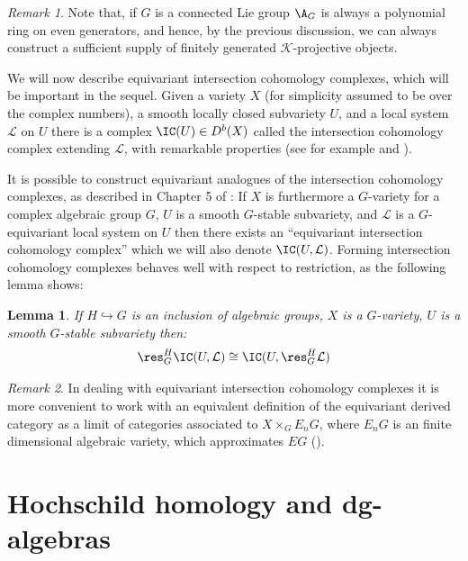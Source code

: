 \documentclass[12pt]{wart}
\newtheorem{lem}[thm]{Lemma}
\theoremstyle{remark}
\newtheorem{remark}{Remark}
\begin{document}
\begin{remark} 
  Note that, if $G$ is a connected Lie group $\A_G$ is
  always a polynomial ring on even generators, and hence, by the
  previous discussion, we can always construct a sufficient supply of
  finitely generated $\mathcal{K}$-projective objects. 
\end{remark}

We will now describe equivariant intersection cohomology complexes,
which will be important in the sequel. Given a variety $X$ (for
simplicity assumed to be over the complex numbers), a smooth locally
closed subvariety $U$, and a local system $\mathcal{L}$ on $U$ there is a complex $\IC(U) \in D^b(X)$ called the intersection
cohomology complex extending $\mathcal{L}$, with remarkable properties
(see for example \cite{BBD} and \cite{GM1}).

It is possible to construct equivariant analogues of the intersection
cohomology complexes, as described in Chapter 5 of \cite{BL}: If $X$
is furthermore a $G$-variety for a complex algebraic group $G$, $U$ is
a smooth $G$-stable subvariety, and $\mathcal{L}$ is a $G$-equivariant local system on $U$ then there exists an ``equivariant intersection
cohomology complex'' which we will also denote $\IC(U, \mathcal{L})$. Forming intersection cohomology complexes behaves well
with respect to restriction, as the following lemma shows:

\begin{lem} \label{res-lemma} 
  If $H \hookrightarrow G$ is an inclusion
  of algebraic groups, $X$ is a $G$-variety, $U$ is a smooth $G$-stable subvariety then:
  \begin{displaymath}
    \res_G^H \IC(U, \mathcal{L}) \cong \IC(U, \res_G^H \mathcal{L})
  \end{displaymath} 
\end{lem}

\begin{remark} In dealing with equivariant intersection cohomology complexes it is more convenient to work with an equivalent definition of the equivariant derived category as a limit of categories associated to $X \times_G E_n G$, where $E_nG$ is an finite dimensional algebraic variety, which approximates $EG$ (\cite{BL}). \end{remark}

\section{Hochschild homology and dg-algebras}
\label{sec:hochsch-homol-dg}
\end{document}
